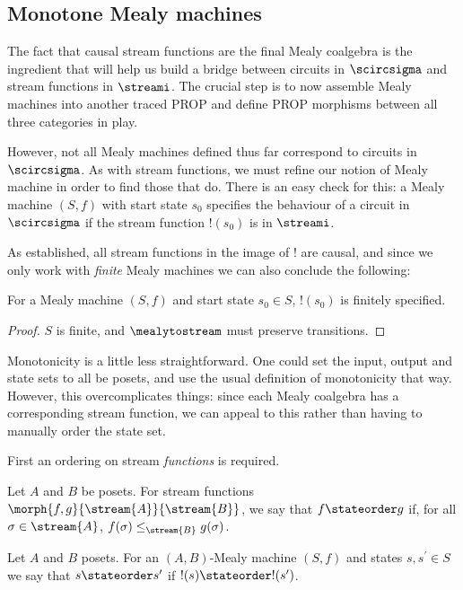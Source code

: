 \subsection{Monotone Mealy machines}

The fact that causal stream functions are the final Mealy coalgebra is the
ingredient that will help us build a bridge between circuits in \(\scircsigma\)
and stream functions in \(\streami\).
The crucial step is to now assemble Mealy machines into another traced PROP
and define PROP morphisms between all three categories in play.

However, not all Mealy machines defined thus far correspond to circuits in
\(\scircsigma\).
As with stream functions, we must refine our notion of Mealy machine in
order to find those that do.
There is an easy check for this: a Mealy machine \((S, f)\) with start state
\(s_0\) specifies the behaviour of a circuit in \(\scircsigma\) if the
stream function \(!(s_0)\) is in \(\streami\).

As established, all stream functions in the image of \(!\) are causal, and since
we only work with \emph{finite} Mealy machines we can also conclude the
following:

\begin{lemma}
    For a Mealy machine \((S, f)\) and start state \(s_0 \in S\), \(!(s_0)\)
    is finitely specified.
\end{lemma}
\begin{proof}
    \(S\) is finite, and \(\mealytostream\) must preserve transitions.
\end{proof}

Monotonicity is a little less straightforward.
One could set the input, output and state sets to all be posets, and use the
usual definition of monotonicity that way.
However, this overcomplicates things: since each Mealy coalgebra has a
corresponding stream function, we can appeal to this rather than having to
manually order the state set.

First an ordering on stream \emph{functions} is required.

\begin{definition}
    Let \(A\) and \(B\) be posets.
    For stream functions \(\morph{f,g}{\stream{A}}{\stream{B}}\), we say that
    \(f \stateorder g\) if, for all \(\sigma \in \stream{A}\),
    \(f(\sigma) \leq_{\stream{B}} g(\sigma)\).
\end{definition}

\begin{definition}
    Let \(A\) and \(B\) posets.
    For an \((A,B)\)-Mealy machine \((S, f)\) and states \(s,s^\prime \in S\)
    we say that \(s \stateorder s^\prime\) if \(!(s) \stateorder !(s^\prime)\).
\end{definition}

